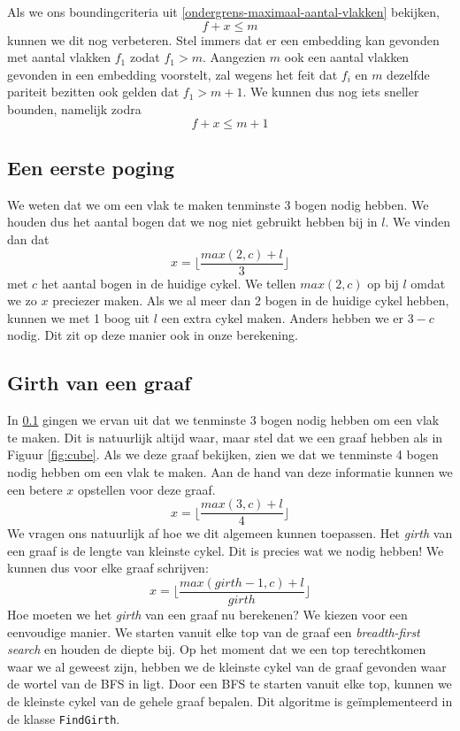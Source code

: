 \documentclass{article}
\begin{document}
Als we ons boundingcriteria uit \ref{ondergrens-maximaal-aantal-vlakken}
bekijken,
\begin{equation*}
f + x \leq m
\end{equation*}
kunnen we dit nog verbeteren. Stel immers dat er een embedding kan gevonden met
aantal vlakken $f_1$ zodat $f_1 > m$. Aangezien $m$ ook een aantal vlakken
gevonden in een embedding voorstelt, zal wegens het feit dat $f_i$ en $m$
dezelfde pariteit bezitten ook gelden dat $f_1 > m + 1$. We kunnen dus nog iets
sneller bounden, namelijk zodra
\begin{equation*}
f + x \leq m + 1
\end{equation*}

\subsection{Een eerste poging}
\label{een-eerste-poging}
We weten dat we om een vlak te maken tenminste 3 bogen nodig hebben. We
houden dus het aantal bogen dat we nog niet gebruikt hebben bij in $l$. We vinden
dan dat
\begin{equation*}
x = \lfloor\frac{max(2, c) + l}{3}\rfloor
\end{equation*}
met $c$ het aantal bogen in de huidige cykel. We tellen $max(2, c)$ op bij $l$
omdat we zo $x$ preciezer maken. Als we al meer dan 2 bogen in de huidige
cykel hebben, kunnen we met 1 boog uit $l$ een extra cykel maken. Anders
hebben we er $3 - c$ nodig. Dit zit op deze manier ook in onze berekening.

\subsection{Girth van een graaf}
In \ref{een-eerste-poging} gingen we ervan uit dat we tenminste 3 bogen nodig
hebben om een vlak te maken. Dit is natuurlijk altijd waar, maar stel dat we
een graaf hebben als in Figuur \ref{fig:cube}. Als we deze graaf bekijken, zien
we dat we tenminste 4 bogen nodig hebben om een vlak te maken. Aan de hand van
deze informatie kunnen we een betere $x$ opstellen voor deze graaf.
\begin{equation*}
x = \lfloor\frac{max(3, c) + l}{4}\rfloor
\end{equation*}
We vragen ons natuurlijk af hoe we dit algemeen kunnen toepassen. Het
\emph{girth} van een graaf is de lengte van kleinste cykel. Dit is precies wat
we nodig hebben! We kunnen dus voor elke graaf schrijven:
\begin{equation*}
x = \lfloor\frac{max(girth - 1, c) + l}{girth}\rfloor
\end{equation*}
Hoe moeten we het \emph{girth} van een graaf nu berekenen? We kiezen voor een
eenvoudige manier. We starten vanuit elke top van de graaf een
\emph{breadth-first search} en houden de diepte bij. Op het moment dat we een
top terechtkomen waar we al geweest zijn, hebben we de kleinste cykel van de
graaf gevonden waar de wortel van de BFS in ligt. Door een BFS te starten vanuit
elke top, kunnen we de kleinste cykel van de gehele graaf bepalen.  Dit
algoritme is ge\"implementeerd in de klasse \verb#FindGirth#.
\newline
\end{document}
